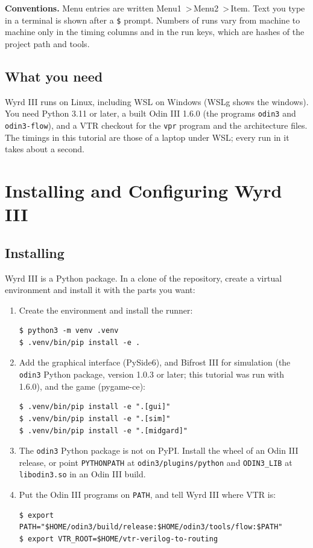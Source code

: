 \documentclass[11pt]{article}
\newcommand{\menu}[1]{\textsf{#1}}
\newcommand{\cmd}[1]{\texttt{#1}}
\newcommand{\gt}{\,\textsf{>}\,}
\begin{document}
\textbf{Conventions.} Menu entries are written \menu{Menu1 \gt Menu2 \gt Item}. Text you type in a terminal
is shown after a \cmd{\$} prompt. Numbers of runs vary from machine to machine only in the timing columns
and in the run keys, which are hashes of the project path and tools.

\subsection{What you need}

Wyrd III runs on Linux, including WSL on Windows (WSLg shows the windows). You need Python 3.11 or later,
a built Odin III 1.6.0 (the programs \cmd{odin3} and \cmd{odin3-flow}), and a VTR checkout for the \cmd{vpr} program
and the architecture files. The timings in this tutorial are those of a laptop under WSL; every run in it
takes about a second.

\section{Installing and Configuring Wyrd III}

\subsection{Installing}

Wyrd III is a Python package. In a clone of the repository, create a virtual environment and install it
with the parts you want:

\begin{enumerate}
\item Create the environment and install the runner:
\begin{lstlisting}[language={}]
$ python3 -m venv .venv
$ .venv/bin/pip install -e .
\end{lstlisting}
\item Add the graphical interface (PySide6), and Bifrost III for simulation (the \cmd{odin3} Python package, version
1.0.3 or later; this tutorial was run with 1.6.0), and the game (pygame-ce):
\begin{lstlisting}[language={}]
$ .venv/bin/pip install -e ".[gui]"
$ .venv/bin/pip install -e ".[sim]"
$ .venv/bin/pip install -e ".[midgard]"
\end{lstlisting}
\item The \cmd{odin3} Python package is not on PyPI. Install the wheel of an Odin III release, or point
\cmd{PYTHONPATH} at \cmd{odin3/plugins/python} and \cmd{ODIN3\_LIB} at \cmd{libodin3.so} in an Odin III build.
\item Put the Odin III programs on \cmd{PATH}, and tell Wyrd III where VTR is:
\begin{lstlisting}[language={}]
$ export PATH="$HOME/odin3/build/release:$HOME/odin3/tools/flow:$PATH"
$ export VTR_ROOT=$HOME/vtr-verilog-to-routing
\end{lstlisting}
\end{enumerate}
\end{document}
